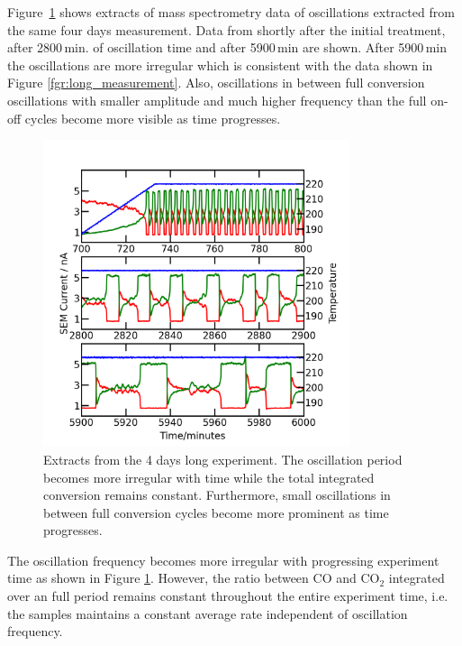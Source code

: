 \documentclass[8.5pt,twoside,twocolumn]{article}
\begin{document}
Figure~\ref{fgr:extracts} shows extracts of mass spectrometry data of oscillations extracted from the same four days measurement. Data from shortly after the initial treatment, after 2800\,min. of oscillation time and after 5900\,min are shown. After 5900\,min the oscillations are more irregular which is consistent with the data shown in Figure \ref{fgr:long_measurement}. Also, oscillations in between full conversion oscillations with smaller amplitude and much higher frequency than the full on-off cycles become more visible as time progresses.
\begin{figure}[h]
  \centering
  \includegraphics[width=9cm]{extracts_from_very_long_oscillation.png}
  \caption{Extracts from the 4 days long experiment. The oscillation period becomes more irregular with time while the total integrated conversion remains constant. Furthermore, small oscillations in between full conversion cycles become more prominent as time progresses.}
  \label{fgr:extracts}
\end{figure}

The oscillation frequency becomes more irregular with progressing experiment time as shown in Figure \ref{fgr:extracts}. However, the ratio between CO and CO$_2$ integrated over an full period remains constant throughout the entire experiment time, i.e. the samples maintains a constant average rate independent of oscillation frequency. 

\end{document}
